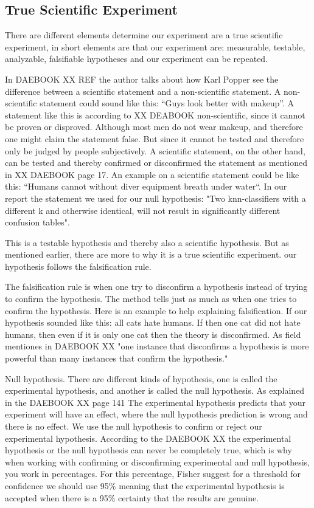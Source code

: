 \subsection{True Scientific Experiment}
There are different elements determine our experiment are a true scientific experiment, in short elements are that our experiment are: measurable, testable, analyzable, falsifiable hypotheses and our experiment can be repeated.

In DAEBOOK XX REF the author talks about how Karl Popper see the difference between a scientific statement and a non-scientific statement. A non-scientific statement could sound like this: “Guys look better with makeup”. A statement like this is according to XX DEABOOK non-scientific, since it cannot be proven or disproved. Although most men do not wear makeup, and therefore one might claim the statement false. But since it cannot be tested and therefore only be judged by people subjectively. 
A scientific statement, on the other hand, can be tested and thereby confirmed or disconfirmed the statement as mentioned in XX DAEBOOK page 17. An example on a scientific statement could be like this: “Humans cannot without diver equipment breath under water“.
In our report the statement we used for our null hypothesis: "Two knn-classifiers with a different k and otherwise identical, will not result in significantly different confusion tables". 

This is a testable hypothesis and thereby also a scientific hypothesis. But as mentioned earlier, there are more to why it is a true scientific experiment. our hypothesis follows the falsification rule.

The falsification rule is when one try to disconfirm a hypothesis instead of trying to confirm the hypothesis. The method tells just as much as when one tries to confirm the hypothesis. Here is an example to help explaining  falsification. If our hypothesis sounded like this: all cats hate humans. If then one cat did not hate humans, then even if it is only one cat then the theory is disconfirmed. As field mentiones in DAEBOOK XX "one instance that disconfirms a hypothesis is more powerful than many instances that confirm the hypothesis."

Null hypothesis.
There are different kinds of hypothesis, one is called the experimental hypothesis, and another is called the null hypothesis. As explained in the DAEBOOK XX page 141 The experimental hypothesis predicts that your experiment will have an effect, where the null hypothesis prediction is wrong and there is no effect.
We use the null hypothesis to confirm or reject our experimental hypothesis. According to the DAEBOOK XX the experimental hypothesis or the null hypothesis can never be completely true, which is why when working with confirming or disconfirming experimental and null hypothesis, you work in percentages. For this percentage, Fisher suggest for a threshold for confidence we should use 95\% meaning that the experimental hypothesis is accepted when there is a 95\% certainty that the results are genuine.

